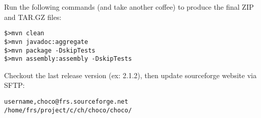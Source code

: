 \documentclass[11pt]{amsart}
\begin{document}
\vspace{.5cm}
Run the following commands (and take another coffee) to produce the final ZIP and TAR.GZ files:
\begin{lstlisting}
$>mvn clean
$>mvn javadoc:aggregate
$>mvn package -DskipTests
$>mvn assembly:assembly -DskipTests
\end{lstlisting}

\vspace{.5cm}
Checkout the last release version (ex: 2.1.2), then update sourceforge website via SFTP:
\begin{lstlisting}
username,choco@frs.sourceforge.net
/home/frs/project/c/ch/choco/choco/
\end{lstlisting}

\end{document}
